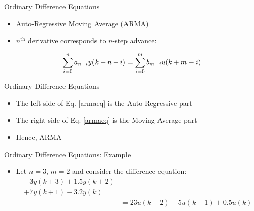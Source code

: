 \begin{frame}
Ordinary Difference Equations
\begin{itemize}
  \item Auto-Regressive Moving Average (ARMA)
  \item $n^{\text{th}}$ derivative corresponds to $n$-step advance:
\end{itemize} 
\begin{equation}\label{armaeq}
\sum_{i=0}^na_{n-i}y(k+n-i) = \sum_{i=0}^mb_{m-i}u(k+m-i)
\end{equation}
\end{frame}
\begin{frame}
Ordinary Difference Equations
\begin{itemize}
  \item The left side of Eq. \eqref{armaeq} is the Auto-Regressive part
  \item The right side of Eq. \eqref{armaeq} is the Moving Average part
  \item Hence, ARMA
\end{itemize} 
\end{frame}
\begin{frame}
Ordinary Difference Equations: Example
\begin{itemize}
  \item Let $n=3$, $m=2$ and consider the difference equation:
\begin{align*}
-3y(k+3)+1.5y(k+2)\\
 +7y(k+1)-3.2y(k)\\
&=23u(k+2)-5u(k+1)+0.5u(k)
\end{align*}
\end{itemize} 
\end{frame}
